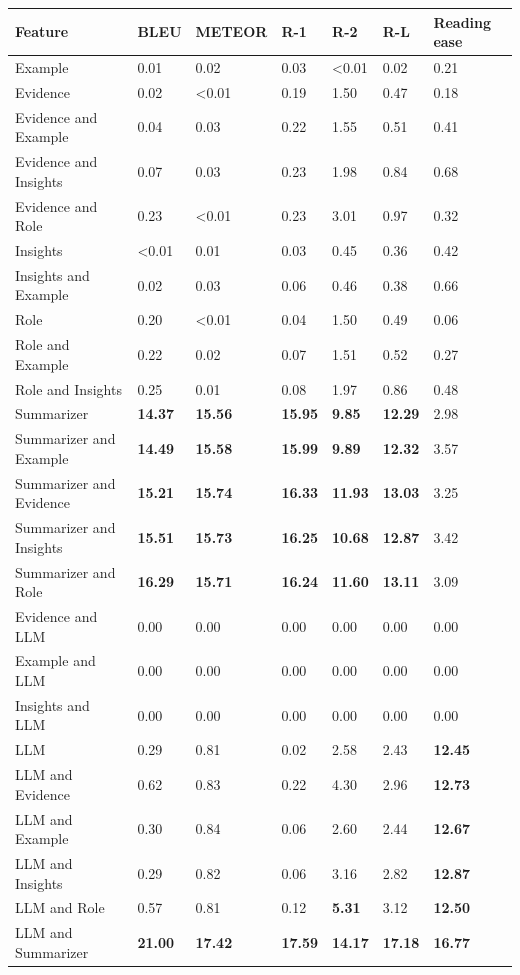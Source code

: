 \begin{tabular}{|l|l|l|l|l|l|l|}
\hline
\textbf{Feature} & BLEU & METEOR & R-1 & R-2 & R-L & Reading ease \\
 \hline
 Example & 0.01 & 0.02 & 0.03 & \textless{}0.01 & 0.02 & 0.21 \\
 \hline
 Evidence & 0.02 & \textless{}0.01 & 0.19 & 1.50 & 0.47 & 0.18 \\
 \hline
 Evidence and Example & 0.04 & 0.03 & 0.22 & 1.55 & 0.51 & 0.41 \\
 \hline
 Evidence and Insights & 0.07 & 0.03 & 0.23 & 1.98 & 0.84 & 0.68 \\
 \hline
 Evidence and Role & 0.23 & \textless{}0.01 & 0.23 & 3.01 & 0.97 & 0.32 \\
 \hline
 Insights & \textless{}0.01 & 0.01 & 0.03 & 0.45 & 0.36 & 0.42 \\
 \hline
 Insights and Example & 0.02 & 0.03 & 0.06 & 0.46 & 0.38 & 0.66 \\
 \hline
 Role & 0.20 & \textless{}0.01 & 0.04 & 1.50 & 0.49 & 0.06 \\
 \hline
 Role and Example & 0.22 & 0.02 & 0.07 & 1.51 & 0.52 & 0.27 \\
 \hline
 Role and Insights & 0.25 & 0.01 & 0.08 & 1.97 & 0.86 & 0.48 \\
 \hline
 Summarizer & \textbf{14.37} & \textbf{15.56} & \textbf{15.95} & \textbf{9.85} & \textbf{12.29} & 2.98 \\
 \hline
 Summarizer and Example & \textbf{14.49} & \textbf{15.58} & \textbf{15.99} & \textbf{9.89} & \textbf{12.32} & 3.57 \\
 \hline
 Summarizer and Evidence & \textbf{15.21} & \textbf{15.74} & \textbf{16.33} & \textbf{11.93} & \textbf{13.03} & 3.25 \\
 \hline
 Summarizer and Insights & \textbf{15.51} & \textbf{15.73} & \textbf{16.25} & \textbf{10.68} & \textbf{12.87} & 3.42 \\
 \hline
 Summarizer and Role & \textbf{16.29} & \textbf{15.71} & \textbf{16.24} & \textbf{11.60} & \textbf{13.11} & 3.09 \\
 \hline
 Evidence and LLM & 0.00 & 0.00 & 0.00 & 0.00 & 0.00 & 0.00 \\
 \hline
 Example and LLM & 0.00 & 0.00 & 0.00 & 0.00 & 0.00 & 0.00 \\
 \hline
 Insights and LLM & 0.00 & 0.00 & 0.00 & 0.00 & 0.00 & 0.00 \\
 \hline
 LLM & 0.29 & 0.81 & 0.02 & 2.58 & 2.43 & \textbf{12.45} \\
 \hline
 LLM and Evidence & 0.62 & 0.83 & 0.22 & 4.30 & 2.96 & \textbf{12.73} \\
 \hline
 LLM and Example & 0.30 & 0.84 & 0.06 & 2.60 & 2.44 & \textbf{12.67} \\
 \hline
 LLM and Insights & 0.29 & 0.82 & 0.06 & 3.16 & 2.82 & \textbf{12.87} \\
 \hline
 LLM and Role & 0.57 & 0.81 & 0.12 & \textbf{5.31} & 3.12 & \textbf{12.50} \\
 \hline
 LLM and Summarizer & \textbf{21.00} & \textbf{17.42} & \textbf{17.59} & \textbf{14.17} & \textbf{17.18} & \textbf{16.77} \\
\hline
\end{tabular}

